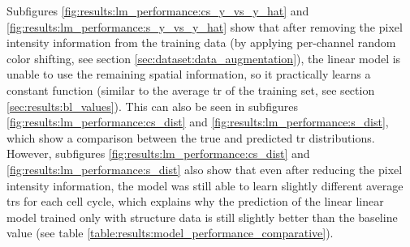 Subfigures \ref{fig:results:lm_performance:cs_y_vs_y_hat} and \ref{fig:results:lm_performance:s_y_vs_y_hat} show that after removing the pixel intensity information from the training data (by applying per-channel random color shifting, see section \ref{sec:dataset:data_augmentation}), the linear model is unable to use the remaining spatial information, so it practically learns a constant function (similar to the average \gls{tr} of the training set, see section \ref{sec:results:bl_values}).
This can also be seen in subfigures \ref{fig:results:lm_performance:cs_dist} and \ref{fig:results:lm_performance:s_dist}, which show a comparison between the true and predicted \gls{tr} distributions.
However, subfigures \ref{fig:results:lm_performance:cs_dist} and \ref{fig:results:lm_performance:s_dist} also show that even after reducing the pixel intensity information, the model was still able to learn slightly different average \glspl{tr} for each cell cycle, which explains why the prediction of the linear linear model trained only with structure data is still slightly better than the baseline value (see table \ref{table:results:model_performance_comparative}).
